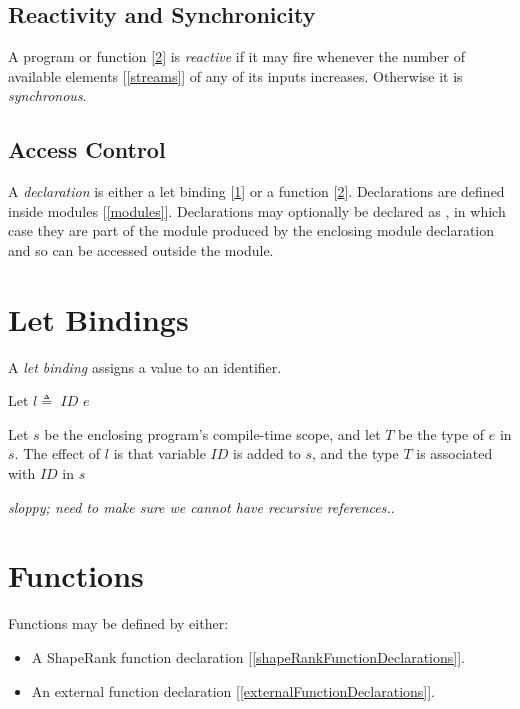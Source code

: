\documentclass{article}
\begin{document}
\subsection{Reactivity and Synchronicity}
\label{reactivityAndSynchronicity}

A program or function [\ref{functions}] is {\em reactive} if it may fire whenever the number of available elements [\ref{streams}] of any of its inputs increases. Otherwise it is {\em synchronous}.

\subsection{Access Control}
\label{accessControl}

A {\em declaration} is either a let binding [\ref{letBindings}] or a function [\ref{functions}]. Declarations are defined inside modules [\ref{modules}]. Declarations may optionally be declared as \PUBLIC{}, in which case they are part of the module produced by the enclosing module declaration and so can be accessed outside the module.


\section{Let Bindings}
\label{letBindings}

A {\em let binding} assigns a value to an identifier. 

\LetBinding{}

Let  $l \triangleq $ \LET{} $ID$ \BIND{} $e$

Let $s$ be the enclosing program's compile-time scope, and let $T$ be the type of $e$ in $s$.
The effect of $l$ is that variable $ID$ is added to $s$, and the type $T$ is associated with $ID$ in $s$

{\em sloppy; need to make sure we cannot have recursive references.}.


\section{Functions}
\label{functions}

Functions may be defined by either:
\begin{itemize}
\item A ShapeRank function declaration [\ref{shapeRankFunctionDeclarations}].
\item An external function declaration [\ref{externalFunctionDeclarations}]. 
\end{itemize}
\end{document}
